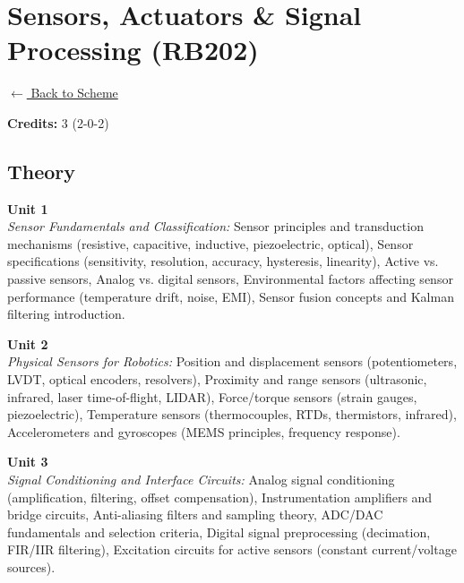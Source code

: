 \section*{Sensors, Actuators \& Signal Processing (RB202)}
\label{major:RB_2}

\noindent \small{\hyperref[main:scheme]{$\leftarrow$ Back to Scheme}} \vspace{0.5cm}

\noindent \textbf{Credits:} 3 (2-0-2)

\subsection*{Theory}
\noindent\textbf{Unit 1} \\
\textit{Sensor Fundamentals and Classification:} Sensor principles and transduction mechanisms (resistive, capacitive, inductive, piezoelectric, optical), Sensor specifications (sensitivity, resolution, accuracy, hysteresis, linearity), Active vs. passive sensors, Analog vs. digital sensors, Environmental factors affecting sensor performance (temperature drift, noise, EMI), Sensor fusion concepts and Kalman filtering introduction.

\vspace{0.3cm}

\noindent\textbf{Unit 2} \\
\textit{Physical Sensors for Robotics:} Position and displacement sensors (potentiometers, LVDT, optical encoders, resolvers), Proximity and range sensors (ultrasonic, infrared, laser time-of-flight, LIDAR), Force/torque sensors (strain gauges, piezoelectric), Temperature sensors (thermocouples, RTDs, thermistors, infrared), Accelerometers and gyroscopes (MEMS principles, frequency response).

\vspace{0.3cm}

\noindent\textbf{Unit 3} \\
\textit{Signal Conditioning and Interface Circuits:} Analog signal conditioning (amplification, filtering, offset compensation), Instrumentation amplifiers and bridge circuits, Anti-aliasing filters and sampling theory, ADC/DAC fundamentals and selection criteria, Digital signal preprocessing (decimation, FIR/IIR filtering), Excitation circuits for active sensors (constant current/voltage sources).

\vspace{0.3cm}


